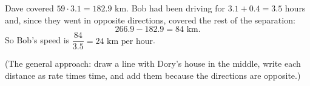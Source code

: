 Dave covered $59\cdot3.1=182.9$ km. Bob had been driving for $3.1+0.4=3.5$ hours and, since they went in opposite directions, covered the rest of the separation:
\[
266.9-182.9=84\text{ km}.
\]
So Bob's speed is $\dfrac{84}{3.5}=\boxed{24\text{ km per hour}}$.

(The general approach: draw a line with Dory's house in the middle, write each distance as rate times time, and add them because the directions are opposite.)

